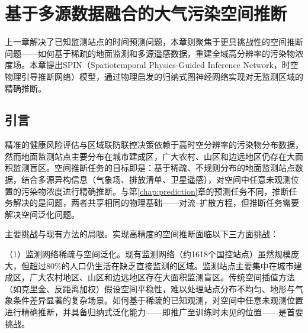 
\chapter{基于多源数据融合的大气污染空间推断}
\label{chap:inference}

上一章解决了已知监测站点的时间预测问题，本章则聚焦于更具挑战性的空间推断问题——如何基于稀疏的地面监测和多源遥感数据，重建全域高分辨率的污染物浓度场。本章提出SPIN（Spatiotemporal Physics-Guided Inference Network，时空物理引导推断网络）模型\citep{wang2025physics}，通过物理启发的归纳式图神经网络实现对无监测区域的精确推断。

\section{引言}
\label{sec:infer_intro}

精准的健康风险评估与区域联防联控决策依赖于高时空分辨率的污染物分布数据，然而地面监测站点主要分布在城市建成区，广大农村、山区和边远地区仍存在大面积监测盲区。空间推断任务的目标即是：基于稀疏、不规则分布的地面监测站点数据，结合多源异构信息（气象场、排放清单、卫星遥感），对空间中任意未观测位置的污染物浓度进行精确推断。与第\ref{chap:prediction}章的预测任务不同，推断任务解决的是问题，两者共享相同的物理基础——对流--扩散方程，但推断任务需要解决空间泛化问题。

主要挑战与现有方法的局限。实现高精度的空间推断面临以下三方面挑战：

（1）监测网络稀疏与空间泛化。现有监测网络（约1618个国控站点）虽然规模庞大，但超过80\%的人口仍生活在缺乏直接监测的区域\citep{southerland2022global,wei2023first}。监测站点主要集中在城市建成区，广大农村地区、山区和边远地区存在大面积监测盲区。传统空间插值方法（如克里金、反距离加权）假设空间平稳性，难以处理站点分布不均匀、地形与气象条件差异显著的复杂场景。如何基于稀疏的已知观测，对空间中任意未观测位置进行精确推断，并具备归纳式泛化能力——即推广至训练时未见的位置——是首要挑战。

